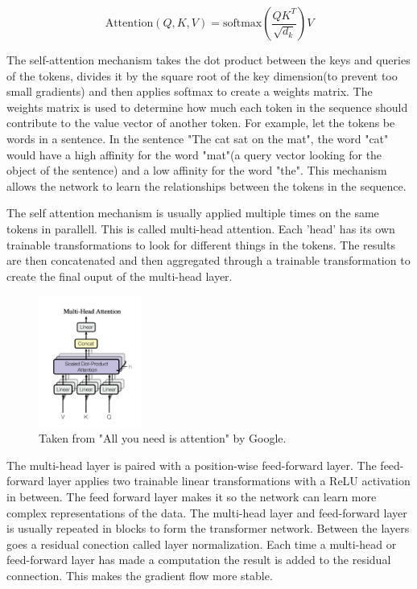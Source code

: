 \documentclass[11pt]{article}
\begin{document}
$$\text{Attention}(Q, K , V) = \text{softmax}(\frac{QK^T}{\sqrt{d_k}})V$$

The self-attention mechanism takes the dot product between the keys and queries of the tokens, divides it by the square root of the key dimension(to prevent too small gradients) and then applies softmax to create a weights matrix. The weights matrix is used to determine how much each token in the sequence should contribute to the value vector of another token. For example, let the tokens be words in a sentence. In the sentence "The cat sat on the mat", the word "cat" would have a high affinity for the word "mat"(a query vector looking for the object of the sentence) and a low affinity for the word "the". This mechanism allows the network to learn the relationships between the tokens in the sequence.

The self attention mechanism is usually applied multiple times on the same tokens in parallell. This is called multi-head attention. Each 'head' has its own trainable transformations to look for different things in the tokens. The results are then concatenated and then aggregated through a trainable transformation to create the final ouput of the multi-head layer.

\begin{figure}[h]
\centering
\includegraphics[width=0.3\textwidth]{multi-head.png}
\caption{Taken from "All you need is attention" by Google. }
\end{figure}

The multi-head layer is paired with a position-wise feed-forward layer. The feed-forward layer applies two trainable linear transformations with a ReLU activation in between. The feed forward layer makes it so the network can learn more complex representations of the data. The multi-head layer and feed-forward layer is usually repeated in blocks to form the transformer network. Between the layers goes a residual conection called layer normalization. Each time a multi-head or feed-forward layer has made a computation the result is added to the residual connection. This makes the gradient flow more stable.
\end{document}
